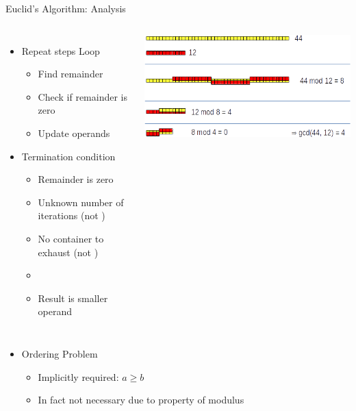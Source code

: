 \begin{frame}{Euclid's Algorithm: Analysis}
%
\begin{columns}
\begin{itemize}
\item Repeat steps \Thus Loop
	\begin{itemize}
	\item Find remainder
	\item Check if remainder is zero
	\item Update operands
	\end{itemize}
\item Termination condition
	\begin{itemize}
	\item Remainder is zero
	\item Unknown number of iterations (not )
	\item No container to exhaust (not )
	\item[\Thus] 
	\item Result is smaller operand
	\end{itemize}
\end{itemize}
%
\includegraphics[width=\linewidth]{./gfx/Euclid-GCD}
\end{columns}
%
\begin{itemize}
\item Ordering Problem
	\begin{itemize}
	\item Implicitly required: $a \geq b$
	\item In fact not necessary due to property of modulus
	\end{itemize}
\end{itemize}
%
\end{frame}


